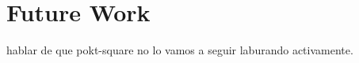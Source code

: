 \section{Future Work}\label{sec:z}

hablar de que pokt-square no lo vamos a seguir laburando activamente.
